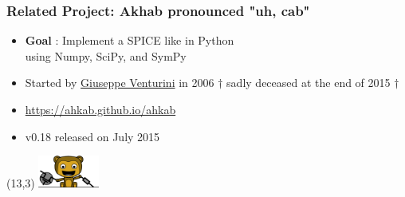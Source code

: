 
\begin{frame}
  \frametitle{Related Project: Akhab \hspace{1em} \small{pronounced "uh, cab"}}
  \begin{itemize}
  \item \textbf{Goal} : Implement a SPICE like in Python \\
    using Numpy, SciPy, and SymPy
  \item Started by \href{http://ggventurini.io}{Giuseppe Venturini} in 2006 {\tiny $\dag$ sadly deceased at the end of 2015 $\dag$}
  \item \url{https://ahkab.github.io/ahkab} %
  \item v0.18 released on July 2015
  \end{itemize}
  \begin{textblock}{4}(13,3)
    \includegraphics[width=2cm]{images/akhab.png}
  \end{textblock}
\end{frame}


